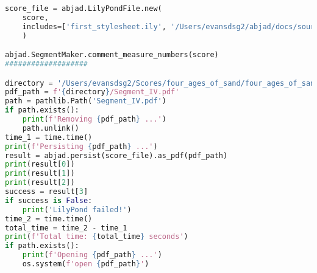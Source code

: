\begin{lstlisting}[language=Python, caption=Four Ages of Sand Segment\_IV]
score_file = abjad.LilyPondFile.new(
    score,
    includes=['first_stylesheet.ily', '/Users/evansdsg2/abjad/docs/source/_stylesheets/abjad.ily'],
    )

abjad.SegmentMaker.comment_measure_numbers(score)
###################

directory = '/Users/evansdsg2/Scores/four_ages_of_sand/four_ages_of_sand/Segments/Segment_IV'
pdf_path = f'{directory}/Segment_IV.pdf'
path = pathlib.Path('Segment_IV.pdf')
if path.exists():
    print(f'Removing {pdf_path} ...')
    path.unlink()
time_1 = time.time()
print(f'Persisting {pdf_path} ...')
result = abjad.persist(score_file).as_pdf(pdf_path)
print(result[0])
print(result[1])
print(result[2])
success = result[3]
if success is False:
    print('LilyPond failed!')
time_2 = time.time()
total_time = time_2 - time_1
print(f'Total time: {total_time} seconds')
if path.exists():
    print(f'Opening {pdf_path} ...')
    os.system(f'open {pdf_path}')
\end{lstlisting}
\doublespace

